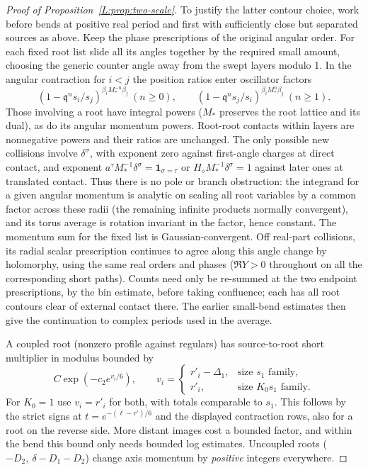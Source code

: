 \documentclass[11pt]{article}
\numberwithin{equation}{section}
\theoremstyle{definition}\newtheorem{definition}[theorem]{Definition}
\theoremstyle{remark}\newtheorem{remark}[theorem]{Remark}
\begin{document}
\begin{proof}[Proof of Proposition~\ref{L:prop:two-scale}]
To justify the latter contour choice, work before bends at positive real period and first with sufficiently close but separated sources as above. Keep the phase prescriptions of the original angular order. For each fixed root list slide all its angles together by the required small amount, choosing the generic counter angle away from the swept layers modulo 1. In the angular contraction for \(i<j\) the position ratios enter oscillator factors
\[
 (1-\mathfrak q^n s_i/s_j)^{\beta_i M_*^{-n}\beta_j}\ (n\ge0),
 \qquad
 (1-\mathfrak q^n s_j/s_i)^{\beta_i M_*^n\beta_j}\ (n\ge1).
\]
Those involving a root have integral powers (\(M_*\) preserves the root lattice and its dual), as do its angular momentum powers. Root-root contacts within layers are nonnegative powers and their ratios are unchanged. The only possible new collisions involve \(\delta^\sigma\), with exponent zero against first-angle charges at direct contact, and exponent \(a^\tau M_*^{-1}\delta^\sigma=\mathbf1_{\sigma=\tau}\) or \(H_\diamond M_*^{-1}\delta^\sigma=1\) against later ones at translated contact. Thus there is no pole or branch obstruction: the integrand for a given angular momentum is analytic on scaling all root variables by a common factor across these radii (the remaining infinite products normally convergent), and its torus average is rotation invariant in the factor, hence constant. The momentum sum for the fixed list is Gaussian-convergent. Off real-part collisions, its radial scalar prescription continues to agree along this angle change by holomorphy, using the same real orders and phases (\(\Re Y>0\) throughout on all the corresponding short paths). Counts need only be re-summed at the two endpoint prescriptions, by the bin estimate, before taking confluence; each has all root contours clear of external contact there. The earlier small-bend estimates then give the continuation to complex periods used in the average.

A coupled root (nonzero profile against regulars) has source-to-root short multiplier in modulus bounded by
\[
 C\exp(-c_2 e^{v_i/6}),\qquad
 v_i=\begin{cases} r'_i-\Delta_1,&\text{size }s_1\text{ family},\\
                    r'_i,&\text{size }K_0s_1\text{ family}.
       \end{cases}
\]
For \(K_0=1\) use \(v_i=r'_i\) for both, with totals comparable to \(s_1\). This follows by the strict signs at \(t=e^{-(\ell-r')/6}\) and the displayed contraction rows, also for a root on the reverse side. More distant images cost a bounded factor, and within the bend this bound only needs bounded log estimates. Uncoupled roots (\(-D_2,\ \delta-D_1-D_2\)) change axis momentum by \emph{positive} integers everywhere.


\end{proof}
\end{document}
